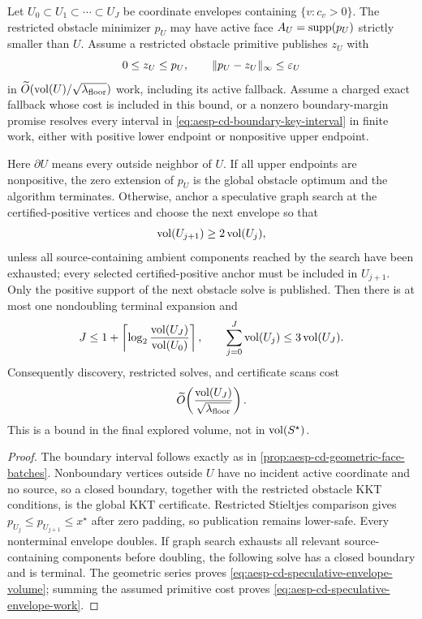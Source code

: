\begin{proposition}
\label{prop:aesp-cd-speculative-envelope-doubling}
Let $U_0\subset U_1\subset\cdots\subset U_J$ be coordinate envelopes
containing $\{v:c_v>0\}$.  The restricted obstacle minimizer $p_U$ may
have active face $A_U=\operatorname{supp}(p_U)$ strictly smaller than $U$.  Assume a
restricted obstacle primitive publishes $z_U$ with
\begin{equation*}
 0\leq z_U\leq p_U,\qquad
 \lVert p_U-z_U\rVert_\infty\leq\varepsilon_U
\end{equation*}
in
$\widetilde O(\operatorname{vol}(U)/\sqrt{\lambda_{\rm floor}})$ work, including its
active fallback.  Assume a charged exact fallback whose cost is included in
this bound, or a nonzero
boundary-margin promise resolves every interval in
\cref{eq:aesp-cd-boundary-key-interval} in finite work, either with positive
lower endpoint or nonpositive upper endpoint.

Here $\partial U$ means every outside neighbor of $U$.  If all upper
endpoints are nonpositive, the zero extension of $p_U$ is the
global obstacle optimum and the algorithm terminates.  Otherwise, anchor a
speculative graph search at the certified-positive vertices and choose the
next envelope so that
\begin{equation*}
 \operatorname{vol}(U_{j+1})\geq2\operatorname{vol}(U_j),
\end{equation*}
unless all source-containing ambient components reached by the search have
been exhausted; every selected certified-positive anchor must be included in
$U_{j+1}$.  Only the positive support of the next obstacle solve is
published.  Then there is at most one
nondoubling terminal expansion and
\begin{equation}
 J\leq1+\left\lceil\log_2
   \frac{\operatorname{vol}(U_J)}{\operatorname{vol}(U_0)}\right\rceil,\qquad
 \sum_{j=0}^J\operatorname{vol}(U_j)\leq3\operatorname{vol}(U_J).
 \label{eq:aesp-cd-speculative-envelope-volume}
\end{equation}
Consequently discovery, restricted solves, and certificate scans cost
\begin{equation}
 \widetilde O\!\left(
   \frac{\operatorname{vol}(U_J)}{\sqrt{\lambda_{\rm floor}}}
 \right).
 \label{eq:aesp-cd-speculative-envelope-work}
\end{equation}
This is a bound in the final explored volume, not in
$\operatorname{vol}(S^\star)$.
\end{proposition}

\begin{proof}
The boundary interval follows exactly as in
\cref{prop:aesp-cd-geometric-face-batches}.  Nonboundary vertices outside
$U$ have no incident active coordinate and no source, so a closed boundary,
together with the restricted obstacle KKT conditions, is the global KKT
certificate.  Restricted Stieltjes comparison gives
$p_{U_j}\leq p_{U_{j+1}}\leq x^\star$ after zero padding, so publication
remains lower-safe.  Every nonterminal envelope doubles.  If graph search
exhausts all relevant source-containing components before doubling, the
following solve has a closed boundary and is terminal.  The geometric series proves
\cref{eq:aesp-cd-speculative-envelope-volume}; summing the assumed primitive
cost proves \cref{eq:aesp-cd-speculative-envelope-work}.
\end{proof}

